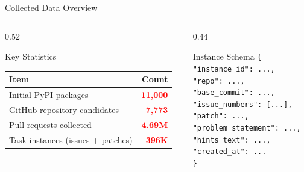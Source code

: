 \documentclass[t, aspectratio=169]{beamer}
\newcommand{\stat}[1]{\textcolor{red}{\textbf{#1}}}
\begin{document}
\begin{frame}{Collected Data Overview}
\small
\begin{columns}[T]
\begin{column}{0.52\textwidth}
\begin{block}{Key Statistics}
\footnotesize
\begin{tabular}{@{}l r@{}}
\toprule
\textbf{Item} & \textbf{Count} \\
\midrule
Initial PyPI packages & \stat{11,000} \\
GitHub repository candidates & \stat{7,773} \\
Pull requests collected & \stat{4.69M} \\
Task instances (issues + patches) & \stat{396K} \\
\bottomrule
\end{tabular}
\end{block}
\end{column}
\begin{column}{0.44\textwidth}
\begin{block}{Instance Schema}
\footnotesize
\texttt{\{\\
\hspace*{0.25cm}"instance\_id": ...,\\
\hspace*{0.25cm}"repo": ...,\\
\hspace*{0.25cm}"base\_commit": ...,\\
\hspace*{0.25cm}"issue\_numbers": [...],\\
\hspace*{0.25cm}"patch": ...,\\
\hspace*{0.25cm}"problem\_statement": ...,\\
\hspace*{0.25cm}"hints\_text": ...,\\
\hspace*{0.25cm}"created\_at": ...\\
\}}
\end{block}
\end{column}
\end{columns}
\end{frame}
\end{document}
